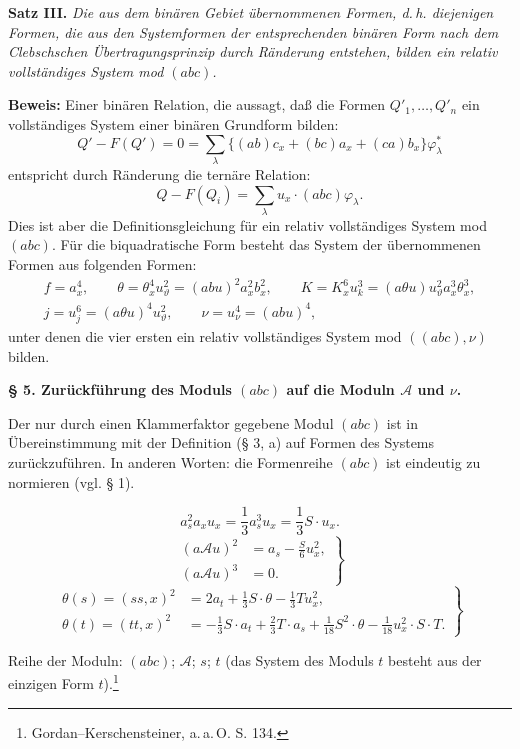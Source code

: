 \documentclass[11pt]{article}
\newcommand{\A}{\mathcal A}
\begin{document}
\noindent\textbf{Satz III.}
\emph{Die aus dem binären Gebiet übernommenen Formen, d.\,h. diejenigen Formen, die aus den Systemformen der entsprechenden binären Form nach dem Clebschschen Übertragungsprinzip durch Ränderung entstehen, bilden ein relativ vollständiges System mod $(abc)$.}

\noindent\textbf{Beweis:}
Einer binären Relation, die aussagt, daß die Formen $Q'_1,\ldots,Q'_n$ ein vollständiges System einer binären Grundform bilden:
\[
Q'-F(Q')=0=\sum_\lambda\bigl\{(ab)c_x+(bc)a_x+(ca)b_x\bigr\}\varphi_\lambda^{*}
\]
entspricht durch Ränderung die ternäre Relation:
\[
Q-F(Q_i)=\sum_\lambda u_x\cdot(abc)\varphi_\lambda .
\]
Dies ist aber die Definitionsgleichung für ein relativ vollständiges System mod $(abc)$. Für die biquadratische Form besteht das System der übernommenen Formen aus folgenden Formen:
\[
\begin{gathered}
f=a_x^4,\qquad
\theta=\theta_x^4u_\vartheta^2=(abu)^2a_x^2b_x^2,\qquad
K=K_x^6u_k^3=(a\theta u)u_\vartheta^2a_x^3\theta_x^3,\\
j=u_j^6=(a\theta u)^4u_\vartheta^2,\qquad
\nu=u_\nu^4=(abu)^4,
\end{gathered}
\]
unter denen die vier ersten ein relativ vollständiges System mod $((abc),\nu)$ bilden.

\begin{center}
\textbf{§ 5. \quad Zurückführung des Moduls $(abc)$ auf die Moduln $\A$ und $\nu$.}
\end{center}

Der nur durch einen Klammerfaktor gegebene Modul $(abc)$ ist in Übereinstimmung mit der Definition (§ 3, a) auf Formen des Systems zurückzuführen. In anderen Worten: die Formenreihe $(abc)$ ist eindeutig zu normieren (vgl. § 1).

\[
a_s^2a_xu_x=\frac13 a_s^3u_x=\frac13 S\cdot u_x. \tag{2}
\]
\[
\left.
\begin{aligned}
(a\A u)^2&=a_s-\frac{S}{6}u_x^2,\\
(a\A u)^3&=0.
\end{aligned}
\right\} \tag{3}
\]
\[
\left.
\begin{aligned}
\theta(s)=(ss,x)^2&=2a_t+\frac13 S\cdot\theta-\frac13 Tu_x^2,\\
\theta(t)=(tt,x)^2&=-\frac13 S\cdot a_t+\frac23 T\cdot a_s+\frac1{18}S^2\cdot\theta-\frac1{18}u_x^2\cdot S\cdot T.
\end{aligned}
\right\} \tag{4}
\]

Reihe der Moduln: $(abc)$; $\A$; $s$; $t$ (das System des Moduls $t$ besteht aus der einzigen Form $t$).\footnote{Gordan--Kerschensteiner, a.\,a.\,O. S. 134.}
\end{document}
